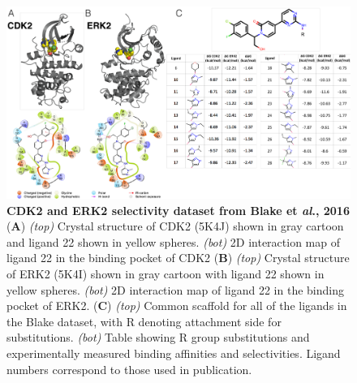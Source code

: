 \documentclass[9pt,lineno]{elife-modified} %
\begin{document}
\begin{figure}
\begin{fullwidth}
\begin{centering}
\includegraphics[width=1.0\linewidth]{figures/figure3.pdf}
\end{centering}
\caption{
\label{fig:figure-3}
{\bf CDK2 and ERK2 selectivity dataset from Blake et \emph{al}., 2016} \\
({\bf A})  \emph{(top)} Crystal structure of CDK2 (5K4J) shown in gray cartoon and ligand 22 shown in yellow spheres. \emph{(bot)} 2D interaction map of ligand 22 in the binding pocket of CDK2
({\bf B}) \emph{(top)} Crystal structure of ERK2 (5K4I) shown in gray cartoon with ligand 22 shown in yellow spheres. \emph{(bot)} 2D interaction map of ligand 22 in the binding pocket of ERK2.
({\bf C}) \emph{(top)} Common scaffold for all of the ligands in the Blake dataset, with R denoting attachment side for substitutions. \emph{(bot)} Table showing R group substitutions and experimentally measured binding affinities and selectivities. Ligand numbers correspond to those used in publication. 
}
\end{fullwidth}
\end{figure}
\end{document}
